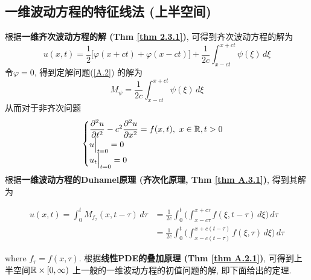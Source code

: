 \newpage

\subsection{一维波动方程的特征线法 (上半空间)}
	根据\textbf{一维齐次波动方程的解 (Thm \ref{thm 2.3.1})}, 可得到齐次波动方程的解为
	\[ u(x , t) = \frac{1}{2} \Big[ \varphi(x + ct) + \varphi(x - ct) \Big] + \frac{1}{2c} \int_{x - ct}^{x + ct} \psi(\xi) \, d\xi \]
	令$\varphi = 0$, 得到定解问题(\ref{A.2}) 的解为
	\[ M_{\psi} = \frac{1}{2c} \int_{x - ct}^{x + ct} \psi(\xi) \, d\xi \]
	从而对于非齐次问题
	\begin{align*}
		\begin{cases}
			\dfrac{\partial^2 u}{\partial t^2} - c^2 \dfrac{\partial^2 u}{\partial x^2} = f(x , t) , \,\, x \in \mathbb{R} , t > 0 \\
			u \Big|_{t = 0} = 0 \\
			u_{t} \Big|_{t = 0} = 0
		\end{cases}
	\end{align*}
	根据\textbf{一维波动方程的Duhamel原理 (齐次化原理, Thm \ref{thm A.3.1})}, 得到其解为
	
	\begin{align*}
		u(x , t) 
		= \int_{0}^t M_{f_\tau}(x , t - \tau) \, d\tau 
		&= \frac{1}{2c} \int_{0}^t \Big( \int_{x - c\tau}^{x + c\tau} f(\xi , t - \tau) \, d\xi \Big) \, d\tau \\
		&= \frac{1}{2c} \int_{0}^t \Big( \int_{x - c(t - \tau)}^{x + c(t - \tau)} f(\xi , \tau) \, d\xi \Big) \, d\tau
	\end{align*}
	
	\vspace*{2em}
	
	where $f_{\tau} = f(x , \tau)$. 根据\textbf{线性PDE的叠加原理 (Thm \ref{thm A.2.1})}, 可得到上半空间$\mathbb{R} \times [0 , \infty)$ 上一般的一维波动方程的初值问题的解, 即下面给出的定理. 
	
	\newpage
	
